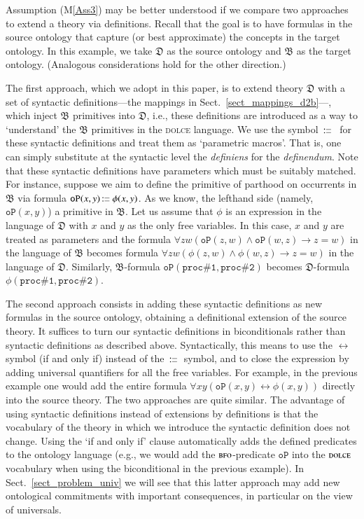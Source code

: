 \documentclass[ao]{iosart2x}
\newcommand{\nb}[1]{\textcolor{red}{$|$}\marginpar{\hspace*{-0cm}\parbox{20mm}{\scriptsize\raggedright\textcolor{red}{#1}}}}
\newcommand{\pr}[1]{\mathtt{#1}}
\newcommand{\cn}[1]{\mathtt{#1}}
\newcommand{\ifif}{\leftrightarrow}
\newcommand\textequal{%
 \rule[.08ex]{5pt}{0.35pt}\llap{\rule[.78ex]{5pt}{0.35pt}}}
\newcommand{\sdef}{{\hspace{1.5pt}:\hspace{-2.5pt}\textequal\hspace{3pt}}}
\newcommand{\dolce}{{\textsc{dolce}}}
\newcommand{\bfo}{{\textsc{bfo}}}
\newcommand {\thdolce} {\ensuremath{\mathfrak{D}}}
\newcommand {\thbfo} {\ensuremath{\mathfrak{B}}}
\newcommand{\bfoopart}{\pr{oP}}
\begin{document}
Assumption (M\ref{Ass3}) may be better understood if we compare two approaches to extend a theory via definitions. 
Recall that the goal is to have formulas in the source ontology that capture (or best approximate) the concepts in the target ontology. In this example, we take {$\thdolce$} as the source ontology and {$\thbfo$} as the target ontology. (Analogous considerations hold for the other direction.)

The first approach, which we adopt in this paper, is to extend theory $\thdolce$ with a set of syntactic definitions---the mappings in Sect.~\ref{sect_mappings_d2b}---, which inject {$\thbfo$} primitives into {$\thdolce$}, i.e., these definitions are introduced as a way to `understand' the {$\thbfo$} primitives in the {\dolce} language. 
We use the symbol {$\sdef$} \,for these syntactic definitions and treat them as `parametric macros'. That is, one can simply substitute at the syntactic level the \emph{definiens} for the \emph{definendum}. Note that these syntactic definitions have parameters which must be suitably matched. For instance, suppose we aim to define the primitive of parthood on occurrents in {$\thbfo$} via formula $\bfoopart(x,y) \sdef \phi(x,y)$. As we know, the lefthand side (namely, $\bfoopart(x,y)$) a primitive in {$\thbfo$}. Let us assume that $\phi$ is an expression in the language of {$\thdolce$} with $x$ and $y$ as the only free variables. %
In this case, $x$ and $y$ are treated as parameters and the formula $\forall zw(\bfoopart(z,w) \land \bfoopart(w,z) \to z=w)$ in the language of {$\thbfo$} becomes formula $\forall zw(\phi(z,w) \land \phi(w,z) \to z=w)$ in the language of {$\thdolce$}. Similarly, {$\thbfo$}-formula $\bfoopart(\cn{proc\#1},\cn{proc\#2})$ becomes {$\thdolce$}-formula $\phi(\cn{proc\#1},\cn{proc\#2})$. 

The second approach consists in adding these syntactic definitions as new formulas in the source ontology, obtaining a definitional extension of the source theory. %
It suffices to turn our syntactic definitions in biconditionals rather than syntactic definitions as described above. Syntactically, this means to use the $\ifif$ symbol (if and only if) instead of the $\sdef$ symbol, and to close the expression by adding universal quantifiers for all the free variables. For example, in the previous example one would add the entire formula $\forall xy(\bfoopart(x,y) \ifif \phi(x,y))$ directly into the source theory. The two approaches are quite similar. The advantage of using syntactic definitions instead of extensions by definitions is that the vocabulary of the theory in which we introduce the syntactic definition does not change. Using the `if and only if' clause automatically adds the defined predicates to the ontology language (e.g., we would add the {$\bfo$}-predicate $\bfoopart$ into the {$\dolce$} vocabulary when using the biconditional in the previous example). In Sect.~\ref{sect_problem_univ} we will see that this latter approach may add new ontological commitments with important consequences, in particular on the view of universals.
\end{document}

